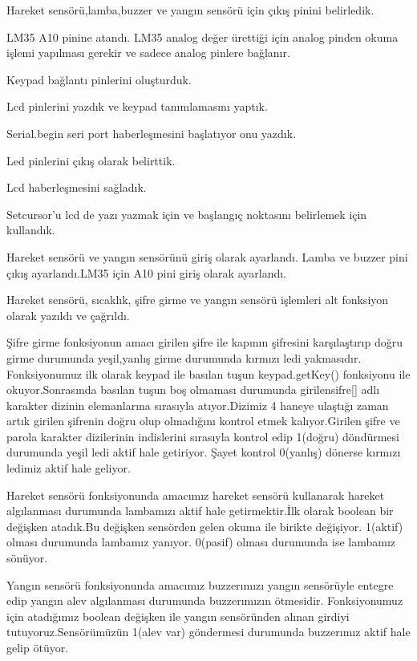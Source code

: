 \documentclass[conference]{IEEEtran}
\begin{document}
Hareket sensörü,lamba,buzzer ve yangın sensörü için çıkış pinini belirledik.

LM35 A10 pinine atandı. LM35 analog değer ürettiği için analog pinden okuma işlemi yapılması gerekir ve sadece analog pinlere bağlanır.

Keypad bağlantı pinlerini oluşturduk.

Lcd pinlerini yazdık ve keypad tanımlamasını yaptık.
 
Serial.begin seri port haberleşmesini başlatıyor onu yazdık.

Led pinlerini çıkış olarak belirttik.
 
Lcd haberleşmesini sağladık.

Setcursor'u lcd de yazı yazmak için ve başlangıç noktasını belirlemek için kullandık.
 
Hareket sensörü ve yangın sensörünü giriş olarak ayarlandı. Lamba ve buzzer pini çıkış ayarlandı.LM35 için A10 pini giriş olarak ayarlandı.

Hareket sensörü, sıcaklık, şifre girme ve yangın sensörü işlemleri alt fonksiyon olarak yazıldı ve çağrıldı.

Şifre girme fonksiyonun amacı girilen şifre ile kapının şifresini karşılaştırıp doğru girme durumunda yeşil,yanlış girme durumunda kırmızı ledi yakmasıdır.
Fonksiyonumuz ilk olarak keypad ile basılan tuşun keypad.getKey() fonksiyonu ile okuyor.Sonrasında basılan tuşun boş olmaması durumunda girilensifre[] adlı karakter dizinin elemanlarına sırasıyla atıyor.Dizimiz 4 haneye ulaştığı zaman artık girilen şifrenin doğru olup olmadığını kontrol etmek kalıyor.Girilen şifre ve parola karakter dizilerinin indislerini sırasıyla kontrol edip 1(doğru) döndürmesi durumunda yeşil ledi aktif hale getiriyor. Şayet kontrol 0(yanlış) dönerse kırmızı ledimiz aktif hale geliyor.

Hareket sensörü fonksiyonunda amacımız hareket sensörü kullanarak hareket algılanması durumunda lambamızı aktif hale getirmektir.İlk olarak boolean bir değişken atadık.Bu değişken sensörden gelen okuma ile birikte değişiyor. 1(aktif) olması durumunda lambamız yanıyor. 0(pasif) olması durumunda ise lambamız sönüyor.

Yangın sensörü fonksiyonunda amacımız buzzerımızı yangın sensörüyle entegre edip yangın alev algılanması durumunda buzzerımızın ötmesidir. Fonksiyonumuz için  atadığımız boolean değişken ile yangın sensöründen alınan girdiyi tutuyoruz.Sensörümüzün 1(alev var) göndermesi durumunda buzzerımız aktif hale gelip ötüyor.
\end{document}
